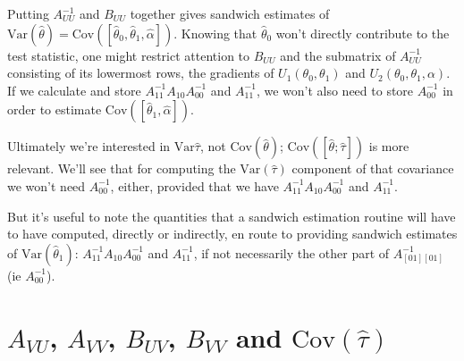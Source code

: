 \documentclass[12pt]{article}
\newcommand{\var}{\mathrm{Var}}
\begin{document}
Putting $A_{UU}^{-1}$ and $B_{UU}$ together gives sandwich estimates of $\var (\hat\theta)
= \mathrm{Cov} ([\hat{\theta}_{0}, \hat{\theta}_{1}, \hat{\alpha}])$.
Knowing that $\hat{\theta}_{0}$ won't directly contribute to the test
statistic, one might restrict attention to $B_{UU}$ and the submatrix
of $A_{UU}^{-1}$ consisting of its lowermost rows, the gradients of $U_{1}(\theta_{0}, \theta_{1})$
and $U_{2}(\theta_{0}, \theta_{1}, \alpha)$. If we calculate and store
$A_{11}^{-1}A_{10}A_{00}^{-1}$ and $A_{11}^{-1}$, we won't also need to store $A_{00}^{-1}$ in order to estimate $\mathrm{Cov}
([\hat{\theta}_{1}, \hat{\alpha}]) $. 

Ultimately we're interested in  $\var\hat\tau$, not $\mathrm{Cov} (\hat\theta)$; 
$\mathrm{Cov} ([\hat\theta;  \hat\tau])$ is more relevant.  We'll see
that for computing the $\var (\hat\tau)$ component of that covariance
we won't need $A_{00}^{-1}$, either, provided that we have $A_{11}^{-1}A_{10}A_{00}^{-1}$ and $A_{11}^{-1}$. 

But it's useful to note
the quantities that a sandwich estimation routine will have to have
computed, directly or indirectly, en route to providing sandwich
estimates of $\var (\hat{\theta}_{1})$: $A_{11}^{-1} A_{10}A_{00}^{-1}$ and $A_{11}^{-1}$, if not
necessarily the other part of $A_{[01][01]}^{-1}$ (ie $A_{00}^{-1}$).

\section{$A_{VU}$, $A_{VV}$, $B_{UV}$, $B_{VV}$ and $\mathrm{Cov}(\hat\tau)$}
\end{document}
